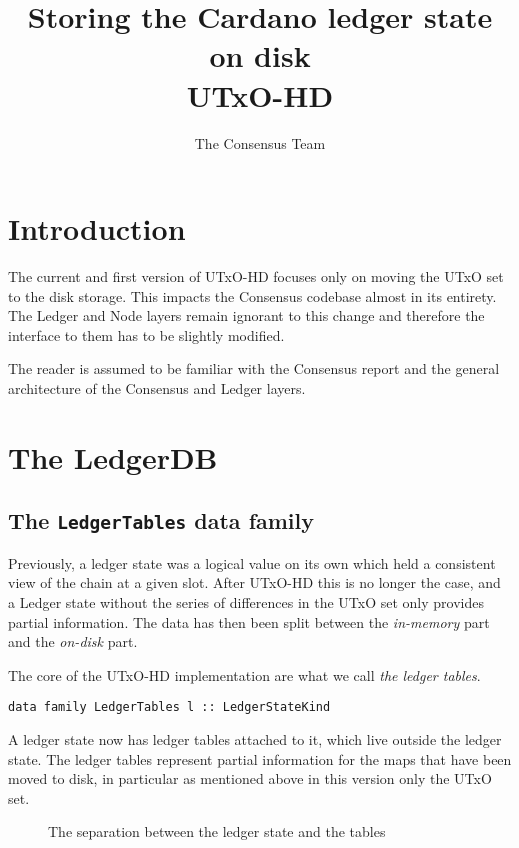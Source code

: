 \documentclass[11pt,a4paper]{article}
\title{Storing the Cardano ledger state on disk\\
       {\large \sc UTxO-HD}
  }
\author{The Consensus Team
  }
\theoremstyle{definition}
\begin{document}
\maketitle

\tableofcontents

\section{Introduction}

The current and first version of UTxO-HD focuses only on moving the UTxO set to
the disk storage. This impacts the Consensus codebase almost in its entirety.
The Ledger and Node layers remain ignorant to this change and therefore the
interface to them has to be slightly modified.

The reader is assumed to be familiar with the Consensus report and the general
architecture of the Consensus and Ledger layers.

\section{The LedgerDB}

\subsection{The \texttt{LedgerTables} data family}

Previously, a ledger state was a logical value on its own which held a
consistent view of the chain at a given slot. After UTxO-HD this is no longer
the case, and a Ledger state without the series of differences in the UTxO set
only provides partial information. The data has then been split between the
\emph{in-memory} part and the \emph{on-disk} part.

The core of the UTxO-HD implementation are what we call \emph{the ledger
  tables}.

\begin{lstlisting}
data family LedgerTables l :: LedgerStateKind
\end{lstlisting}

A ledger state now has ledger tables attached to it, which live
outside the ledger state. The ledger tables represent partial information for
the maps that have been moved to disk, in particular as mentioned above in this
version only the UTxO set.

\begin{figure}[h]
  \centering
  \caption{The separation between the ledger state and the tables}
\end{figure}
\end{document}
